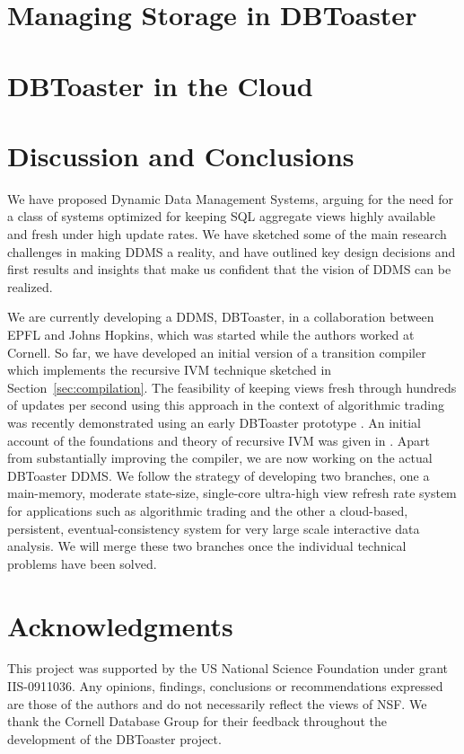 \documentclass{sig-alternate}
\begin{document}
\section{Managing Storage in DBToaster}
\label{sec:storage}



\section{DBToaster in the Cloud}
\label{sec:distribution}


\section{Discussion and Conclusions}
We have proposed Dynamic Data Management Systems,
arguing for the need for a class of systems optimized
for keeping SQL aggregate views highly available and fresh under
high update rates.
We have sketched some of the main research challenges in
making DDMS a reality, and have outlined key design decisions
and first results and insights that make us confident that
the vision of DDMS can be realized.

We are currently developing a DDMS, DBToaster, in a collaboration
between EPFL and Johns Hopkins, which was started while the
authors worked at Cornell.
%
So far, we have developed an initial version of a
transition compiler which implements the recursive IVM technique
sketched in Section~\ref{sec:compilation}. The feasibility of
keeping views fresh through hundreds of updates per second using
this approach in the context of algorithmic trading
was recently demonstrated using an early DBToaster prototype
\cite{ahmad-vldb:09}. An initial account of the foundations and
theory of recursive IVM was given in \cite{koch-pods:10}.
Apart from substantially improving the compiler,
we are now working on the actual DBToaster DDMS. We follow the
strategy of developing two branches, one a main-memory, moderate
state-size, single-core ultra-high view refresh rate system for
applications such as algorithmic trading and the other
a cloud-based, persistent, eventual-consistency system for
very large scale interactive data analysis. We will
merge these two branches once the individual technical
problems have been solved.


\section*{Acknowledgments}


This project was supported by the US National Science Foundation under grant
IIS-0911036. Any opinions, findings, conclusions or recommendations expressed
are those of the authors and do not necessarily reflect the views of NSF.
We thank the Cornell Database Group for their feedback throughout the
development of the DBToaster project.




\end{document}
